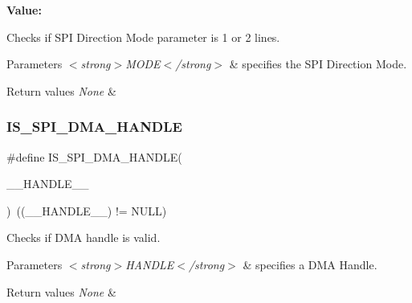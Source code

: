 {\bfseries Value\+:}
\begin{DoxyCode}{0}

\end{DoxyCode}


Checks if S\+PI Direction Mode parameter is 1 or 2 lines. 


\begin{DoxyParams}{Parameters}
{\em $<$strong$>$\+M\+O\+D\+E$<$/strong$>$} & specifies the S\+PI Direction Mode. \\
\hline
\end{DoxyParams}

\begin{DoxyRetVals}{Return values}
{\em None} & \\
\hline
\end{DoxyRetVals}
\mbox{\label{group___s_p_i___private___macros_gae54950bcff11d9165b99957cf8746ae4}} 
\subsubsection{\texorpdfstring{IS\_SPI\_DMA\_HANDLE}{IS\_SPI\_DMA\_HANDLE}}
{\footnotesize\ttfamily \#define I\+S\+\_\+\+S\+P\+I\+\_\+\+D\+M\+A\+\_\+\+H\+A\+N\+D\+LE(\begin{DoxyParamCaption}\item[{}]{\+\_\+\+\_\+\+H\+A\+N\+D\+L\+E\+\_\+\+\_\+ }\end{DoxyParamCaption})~((\+\_\+\+\_\+\+H\+A\+N\+D\+L\+E\+\_\+\+\_\+) != N\+U\+LL)}



Checks if D\+MA handle is valid. 


\begin{DoxyParams}{Parameters}
{\em $<$strong$>$\+H\+A\+N\+D\+L\+E$<$/strong$>$} & specifies a D\+MA Handle. \\
\hline
\end{DoxyParams}

\begin{DoxyRetVals}{Return values}
{\em None} & \\
\hline
\end{DoxyRetVals}
\mbox{\label{group___s_p_i___private___macros_ga780c503aa8adae30dea1f034ac500d7f}} 
